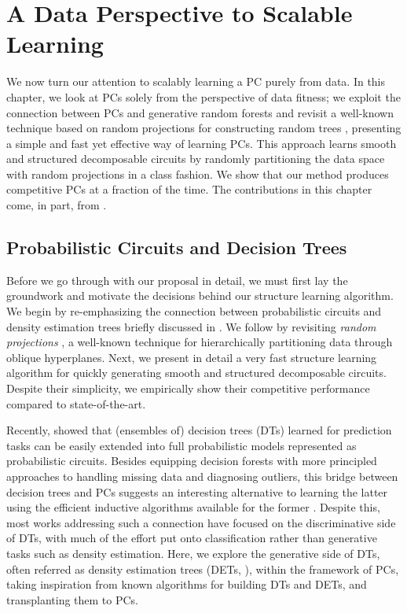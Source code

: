 \chapter{A Data Perspective to Scalable Learning}
\label{ch:data}

We now turn our attention to scalably learning a PC purely from data. In this chapter, we look at
PCs solely from the perspective of data fitness; we exploit the connection between PCs and
generative random forests \citep{correia20,ho95} and revisit a well-known technique based on random
projections for constructing random trees \citep{dasgupta08a,dasgupta08b}, presenting a simple and
fast yet effective way of learning PCs. This approach learns smooth and structured decomposable
circuits by randomly partitioning the data space with random projections in a \divclass{} class
fashion. We show that our method produces competitive PCs at a fraction of the time. The
contributions in this chapter come, in part, from \citet{geh21b}.

\section{Probabilistic Circuits and Decision Trees}
\label{sec:data}

Before we go through with our proposal in detail, we must first lay the groundwork and motivate the
decisions behind our structure learning algorithm. We begin by re-emphasizing the connection
between probabilistic circuits and density estimation trees briefly discussed in . We
follow by revisiting \emph{random projections} \citep{dasgupta08a,dasgupta08b}, a well-known
technique for hierarchically partitioning data through oblique hyperplanes. Next, we present in
detail a very fast structure learning algorithm for quickly generating smooth and structured
decomposable circuits. Despite their simplicity, we empirically show their competitive performance
compared to state-of-the-art.

Recently, \citet{correia20} showed that (ensembles of) decision trees (DTs) learned for prediction
tasks can be easily extended into full probabilistic models represented as probabilistic circuits.
Besides equipping decision forests with more principled approaches to handling missing data and
diagnosing outliers, this bridge between decision trees and PCs suggests an interesting alternative
to learning the latter using the efficient inductive algorithms available for the former
\citep{correia20,ram11,khosravi20}. Despite this, most works addressing such a connection have
focused on the discriminative side of DTs, with much of the effort put onto classification rather
than generative tasks such as density estimation. Here, we explore the generative side of DTs,
often referred as density estimation trees (DETs, \cite{ram11,hang19,smyth95}), within the framework
of PCs, taking inspiration from known algorithms for building DTs and DETs, and transplanting them
to PCs.

